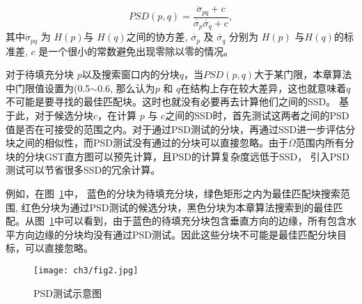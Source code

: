  $$PSD(p,q)=\frac{\acute{\sigma}_{pq}+c}{\acute{\sigma_p}\acute{\sigma_q}+c},$$
其中\(\acute{\sigma}_{pq}\) 为 \(H(p)\)与 \(H(q)\)之间的协方差, \(\acute{\sigma_p}\) 及 \(\acute{\sigma_q}\) 分别为 \(H(p)\) 与\(H(q)\)的标准差, \(c\) 是一个很小的常数避免出现零除以零的情况。\par
 对于待填充分块 \(p\)以及搜索窗口内的分块\(q\)，当\(PSD(p,q)\)大于某门限，本章算法中门限值设置为(0.5\(\sim\)0.6, 那么认为\(p\) 和 \(q\)在结构上存在较大差异，这也就意味着\(q\) 不可能是要寻找的最佳匹配块。这时也就没有必要再去计算他们之间的SSD。 基于此，对于候选分块\(c\)，在计算 \(p\) 与 \(c\)之间的SSD时，首先测试这两者之间的PSD值是否在可接受的范围之内。对于通过PSD测试的分块，再通过SSD进一步评估分块之间的相似性，而PSD测试没有通过的分块可以直接忽略。由于\(\overline{\Omega}\)范围内所有分块的分块GST直方图可以预先计算，且PSD的计算复杂度远低于SSD， 引入PSD测试可以节省很多SSD的冗余计算。\par
例如，在图~\ref{chap03:fig:PSD}中， 蓝色的分块为待填充分块，绿色矩形之内为最佳匹配块搜索范围, 红色分块为通过PSD测试的候选分块，黑色分块为本章算法搜索到的最佳匹配。从图~\ref{chap03:fig:PSD}中可以看到，由于蓝色的待填充分块包含垂直方向的边缘，所有包含水平方向边缘的分块均没有通过PSD测试。因此这些分块不可能是最佳匹配分块目标，可以直接忽略。
 \begin{figure}[!htbp]
 	\begin{center}
 			\texttt{[image: ch3/fig2.jpg]}
 	\end{center}
     \caption{PSD测试示意图}
 	\label{chap03:fig:PSD}
 \end{figure}


